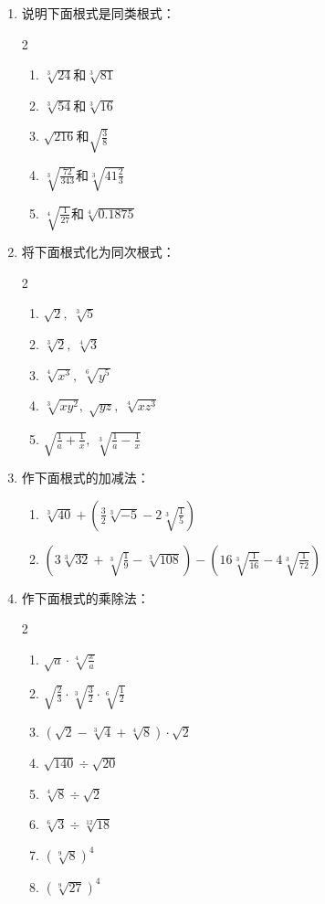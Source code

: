 \begin{ex}
\begin{enumerate}
    \item 说明下面根式是同类根式：
\begin{multicols}{2}
\begin{enumerate}
    \item $\sqrt[3]{24}$和$\sqrt[3]{81}$
    \item $\sqrt[3]{54}$和$\sqrt[3]{16}$
    \item $\sqrt{216}$和$\sqrt{\frac{3}{8}}$
    \item $\sqrt[3]{\frac{72}{343}}$和$\sqrt[3]{41\frac{2}{3}}$
    \item $\sqrt[4]{\frac{1}{27}}$和$\sqrt[4]{0.1875}$
\end{enumerate}
\end{multicols}
    \item  将下面根式化为同次根式：
    \begin{multicols}{2}
\begin{enumerate}
    \item $\sqrt{2},\; \sqrt[3]{5}$
    \item $\sqrt[3]{2},\; \sqrt[4]{3}$
    \item $\sqrt[4]{x^3},\; \sqrt[6]{y^5}$
    \item $\sqrt[3]{xy^2},\; \sqrt{yz},\; \sqrt[4]{xz^3}$
    \item $\sqrt{\frac{1}{a}+\frac{1}{x}},\; \sqrt[3]{\frac{1}{a}-\frac{1}{x}}$
\end{enumerate}
\end{multicols}
    \item 作下面根式的加减法：
\begin{enumerate}
    \item $\sqrt[3]{40}+\left(\frac{3}{2}\sqrt[3]{-5}-2\sqrt[3]{\frac{1}{5}}\right)$
    \item $\left(3\sqrt[3]{32}+\sqrt[3]{\frac{1}{9}}-\sqrt[3]{108}\right)-\left(16\sqrt[3]{\frac{1}{16}}-4\sqrt[3]{\frac{1}{72}}\right)$
\end{enumerate}
    \item 作下面根式的乘除法：
\begin{multicols}{2}
\begin{enumerate}
    \item $\sqrt{a}\cdot \sqrt[4]{\frac{x}{a}}$
    \item $\sqrt{\frac{2}{3}}\cdot \sqrt[3]{\frac{3}{2}}\cdot \sqrt[6]{\frac{1}{2}}$
    \item $\left(\sqrt{2}-\sqrt[3]{4}+\sqrt[4]{8}\right)\cdot \sqrt{2}$
    \item $\sqrt{140}\div \sqrt{20}$
    \item $\sqrt[4]{8}\div \sqrt{2}$
    \item $\sqrt[6]{3}\div \sqrt[12]{18}$
    \item $\left(\sqrt[9]{8}\right)^4$
    \item $\left(\sqrt[9]{27}\right)^4$
\end{enumerate}
\end{multicols}
\end{enumerate}
\end{ex}

